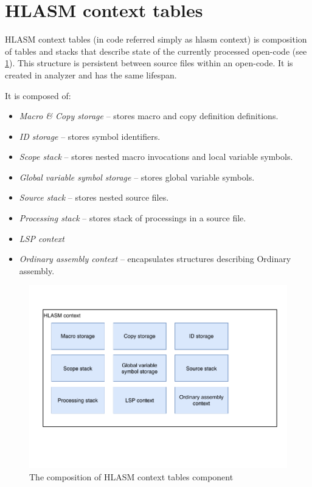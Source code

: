 \section{HLASM context tables}

HLASM context tables (in code referred simply as hlasm context) is composition of tables and stacks that describe state of the currently processed open-code (see \cref{fig06:hlasm}). This structure is persistent between source files within an open-code. It is created in analyzer and has the same lifespan. 

It is composed of:

\begin{itemize}
	\item \emph{Macro \& Copy storage} -- stores macro and copy definition definitions.
	\item \emph{ID storage} -- stores symbol identifiers.
	\item \emph{Scope stack} -- stores nested macro invocations and local variable symbols.
	\item \emph{Global variable symbol storage} -- stores global variable symbols.
	\item \emph{Source stack} -- stores nested source files.
	\item \emph{Processing stack} -- stores stack of processings in a source file.
	\item \emph{LSP context}
	\item \emph{Ordinary assembly context} -- encapsulates structures describing Ordinary assembly.
\end{itemize}

\begin{figure}
	\centering
	\includegraphics[width=\textwidth / 2]{img/hlasm_arch}
	\caption{The composition of HLASM context tables component}
	\label{fig06:hlasm}
\end{figure}

